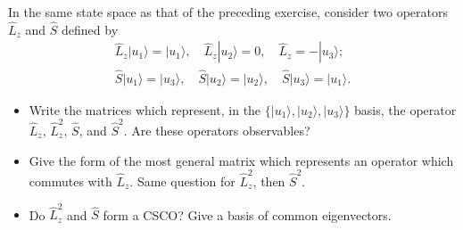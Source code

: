 \documentclass[12pt,a4paper]{article}
\newenvironment{problem}[2][Problem]{\begin{trivlist}
\item[\hskip \labelsep {\bfseries #1}\hskip \labelsep {\bfseries #2.}]}{\end{trivlist}}
\begin{document}
\begin{problem}{5}
[C-T exercise 2-12] In the same state space as that of the preceding exercise, consider two operators $\hat{L}_z$ and $\hat{S}$ defined by
\begin{gather*}
\hat{L}_z|u_1\rangle=|u_1\rangle,\quad\hat{L}_z|u_2\rangle=0,\quad\hat{L}_z=-|u_3\rangle;\\
\hat{S}|u_1\rangle=|u_3\rangle,\quad\hat{S}|u_2\rangle=|u_2\rangle,\quad\hat{S}|u_3\rangle=|u_1\rangle.
\end{gather*}
\begin{itemize}
\item[(a)] Write the matrices which represent, in the $\{|u_1\rangle,|u_2\rangle,|u_3\rangle\}$ basis, the operator $\hat{L}_z$, $\hat{L}_z^2$, $\hat{S}$, and $\hat{S}^2$. Are these operators observables?
\item[(b)] Give the form of the most general matrix which represents an operator which commutes with $\hat{L}_z$. Same question for $\hat{L}_z^2$, then $\hat{S}^2$.
\item[(c)] Do $\hat{L}_z^2$ and $\hat{S}$ form a CSCO? Give a basis of common eigenvectors.
\end{itemize}
\end{problem}
\end{document}
